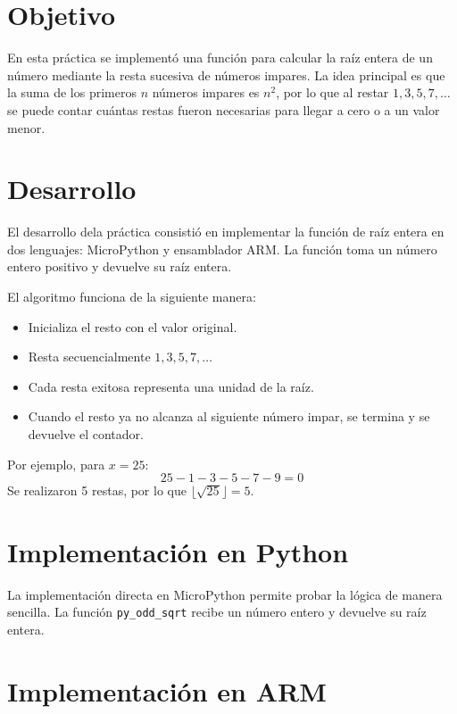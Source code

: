 \documentclass[12pt, letterpaper]{article}
\begin{document}


\section{Objetivo}
En esta práctica se implementó una función para calcular la raíz entera de un
número mediante la resta sucesiva de números impares. La idea principal es que
la suma de los primeros $n$ números impares es $n^2$, por lo que al restar $1,
    3, 5, 7, \dots$ se puede contar cuántas restas fueron necesarias para llegar a
cero o a un valor menor.

\section{Desarrollo}

El desarrollo dela práctica consistió en implementar la función de raíz entera
en dos lenguajes: MicroPython y ensamblador ARM. La función toma un número
entero positivo y devuelve su raíz entera.

El algoritmo funciona de la siguiente manera:
\begin{itemize}
    \item Inicializa el resto con el valor original.
    \item Resta secuencialmente $1, 3, 5, 7, \dots$
    \item Cada resta exitosa representa una unidad de la raíz.
    \item Cuando el resto ya no alcanza al siguiente número impar, se termina y se
          devuelve el contador.
\end{itemize}

Por ejemplo, para $x=25$: $$25 - 1 - 3 - 5 - 7 - 9 = 0$$ Se realizaron 5
restas, por lo que $\lfloor \sqrt{25} \rfloor = 5$.

\section{Implementación en Python}

La implementación directa en MicroPython permite probar la lógica de manera
sencilla. La función \texttt{py\_odd\_sqrt} recibe un número entero y devuelve
su raíz entera.



\section{Implementación en ARM}
\end{document}
